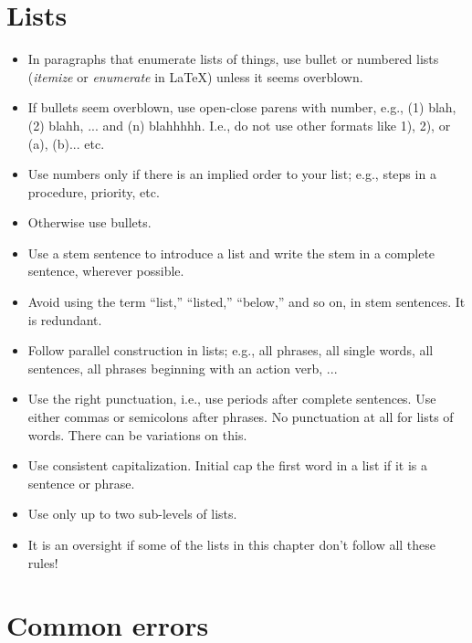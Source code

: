 \section{Lists}
\label{sec:english-lists}

\begin{itemize}
\item In paragraphs that enumerate lists of things, use bullet or numbered lists (\textit{itemize} or \textit{enumerate} in LaTeX) unless it seems overblown.
\item If bullets seem overblown,  use open-close parens with number, e.g., (1) blah, (2) blahh, ... and (n) blahhhhh. I.e., do not use other formats like 1), 2), or (a), (b)... etc.
\item Use numbers only if there is an implied order to your list; e.g., steps in a procedure, priority, etc.
\item Otherwise use bullets.
\item Use a stem sentence to introduce a list and write the stem in a complete sentence, wherever possible.
\item Avoid using the term ``list,'' ``listed,'' ``below,'' and so on, in stem sentences. It is redundant. 
\item Follow parallel construction in lists; e.g., all phrases, all single words, all sentences, all phrases beginning with an action verb, ...
\item Use the right punctuation, i.e., use periods after complete sentences. Use either commas or semicolons after phrases. No punctuation at all for lists of words. There can be variations on this.
\item Use consistent capitalization. Initial cap the first word in a list if it is a sentence or phrase. 
\item Use only up to two sub-levels of lists.
\item It is an oversight if some of the lists in this chapter don't follow all these rules!
\end{itemize}

\section{Common errors}
\label{sec:english-errors}

